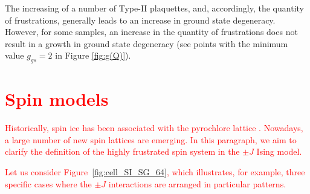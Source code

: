 \documentclass[preprint,12pt]{elsarticle}
\begin{document}
	The increasing of a number of Type-II plaquettes, and, accordingly, the quantity of frustrations, generally leads to an increase in ground state degeneracy. However, for some samples, an increase in the quantity of frustrations does not result in a growth in ground state degeneracy (see points with the minimum value $g_{gs}=2$ in Figure \ref{fig:g(Q)}). 
	
	\section{\textcolor{red}{Spin models}}
	
	\textcolor{red}{Historically, spin ice has been associated with the pyrochlore lattice \cite{skjaervo2020advances, bramwell2020history, udagawa2021spin, ortiz2019colloquium, budrikis2021fifty, castelnovo2012spin}.
	Nowadays, a large number of new spin lattices are emerging. In this paragraph, we aim to clarify the definition of the highly frustrated spin system in the $\pm J$ Ising model.}
	
	\textcolor{red}{Let us consider Figure~\ref{fig:cell_SI_SG_64}, which illustrates, for example, three specific cases where the $\pm J$ interactions are arranged in particular patterns.}
\end{document}

